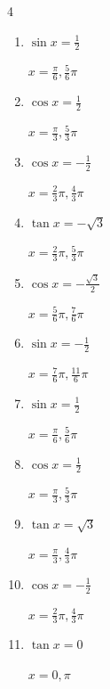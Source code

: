 \begin{multicols}{4}
\begin{enumerate}
        $\displaystyle x = \frac{5}{4}\pi , \frac{7}{4}\pi$

  \item $\displaystyle \sin{x}  = \frac{1}{2}$

        $\displaystyle x = \frac{\pi}{6} , \frac{5}{6}\pi$

  \item $\displaystyle \cos{x}  = \frac{1}{2}$

        $\displaystyle x = \frac{\pi}{3} , \frac{5}{3}\pi$

  \item $\displaystyle \cos{x}  = -\frac{1}{2}$

        $\displaystyle x = \frac{2}{3}\pi , \frac{4}{3}\pi$

  \item $\displaystyle \tan{x}  = -\sqrt{3}$

        $\displaystyle x = \frac{2}{3}\pi , \frac{5}{3}\pi$

  \item $\displaystyle \cos{x}  = -\frac{\sqrt{3}}{2}$

        $\displaystyle x = \frac{5}{6}\pi , \frac{7}{6}\pi$

  \item $\displaystyle \sin{x}  = -\frac{1}{2}$

        $\displaystyle x = \frac{7}{6}\pi , \frac{11}{6}\pi$

  \item $\displaystyle \sin{x}  = \frac{1}{2}$

        $\displaystyle x = \frac{\pi}{6} , \frac{5}{6}\pi$

  \item $\displaystyle \cos{x}  = \frac{1}{2}$

        $\displaystyle x = \frac{\pi}{3} , \frac{5}{3}\pi$

  \item $\displaystyle \tan{x}  = \sqrt{3}$

        $\displaystyle x = \frac{\pi}{3} , \frac{4}{3}\pi$

  \item $\displaystyle \cos{x}  = -\frac{1}{2}$

        $\displaystyle x = \frac{2}{3}\pi , \frac{4}{3}\pi$

  \item $\displaystyle \tan{x}  = 0$

        $\displaystyle x = 0 , \pi$

\columnbreak %


\end{enumerate}
\end{multicols}

